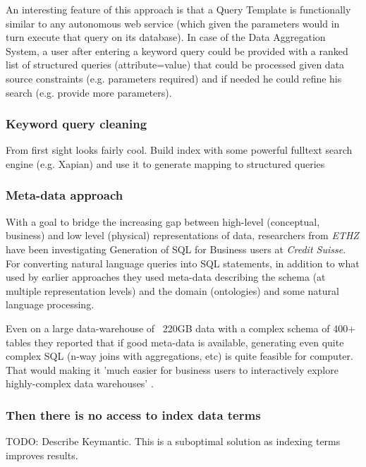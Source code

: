 \documentclass[a4paper,11pt,draft]{article}
\begin{document}
An interesting feature of this approach is that a Query Template is functionally similar to any autonomous web service (which given the parameters would in turn execute that query on its database).  In case of the Data Aggregation System, a user after entering a keyword query could be provided with a ranked list of structured queries (attribute=value) that could be processed given data source constraints (e.g. parameters required) and if needed he could refine his search (e.g. provide more parameters).


\subsubsection*{Keyword query cleaning}
{\color{red} From first sight looks fairly cool. Build index with some powerful fulltext search engine (e.g. Xapian) and use it to generate mapping to structured queries}




\subsubsection*{Meta-data approach}

With a goal to bridge the increasing gap between high-level (conceptual, business) and low level (physical) representations of data, researchers from \textit{ETHZ} have been investigating Generation of SQL for Business users at \textit{Credit Suisse}.  For converting natural language queries 
 into SQL statements, in addition to what used by earlier approaches they used meta-data describing the schema (at multiple representation levels) and the domain (ontologies) and some natural language processing.

Even on a large data-warehouse of ~220GB data with a complex schema of 400+ tables they reported that if good meta-data is available, generating even quite complex SQL  (n-way joins with aggregations, etc) is quite feasible for computer. That would making it 'much easier for business users to interactively explore highly-complex data warehouses' \cite[p.932]{ethz2012}. 


\subsubsection*{Then there is no access to index data terms}
{\color{red} TODO: Describe Keymantic\cite{Keymantic10}. This is a suboptimal solution as indexing terms improves results. }
\end{document}
